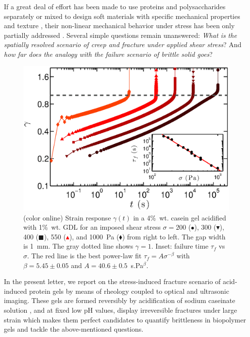 \documentclass[twocolumn,superscriptaddress,showpacs,preprintnumbers,amsmath,amssymb,prl]{revtex4}
\begin{document}
  If a great deal of effort has been made to use proteins and polysaccharides separately or mixed to design soft materials with specific mechanical properties and texture \cite{Dickinson:2006,Gibaud:2012}, their non-linear mechanical behavior under stress has been only partially addressed \cite{vanVliet:1995}. Several simple questions remain unanswered: {\it What is the spatially resolved scenario of creep and fracture under applied shear stress}? And {\it how far does the analogy with the failure scenario of brittle solid goes}? 
\begin{figure}
\centering
\includegraphics[width=0.9\columnwidth]{Fig1.eps}
\caption{(color online) Strain response $\gamma(t)$ in a 4\%~wt. casein gel acidified with 1\%~wt. GDL for an imposed shear stress $\sigma=200$ (\textcolor{red!25!black}{$\bullet$}), 300 (\textcolor{red!50!black}{$\blacktriangledown$}), 400 (\textcolor{red!75!black}{$\blacksquare$}), 550 (\textcolor{red}{$\blacktriangle$}), and 1000~Pa (\textcolor{orange!50!red}{$\blacklozenge$}) from right to left. The gap width is 1~mm. The gray dotted line shows $\gamma=1$. Inset: failure time $\tau_f$ vs $\sigma$. The red line is the best power-law fit $\tau_f=A\sigma^{-\beta}$ with $\beta=5.45\pm 0.05$ and $A=40.6\pm 0.5$~s.Pa$^\beta$.
\label{fig1}}
\end{figure} 
In the present letter, we report on the stress-induced fracture scenario of acid-induced protein gels by means of rheology coupled to optical and ultrasonic imaging. These gels are formed reversibly by acidification of sodium caseinate solution \cite{Lucey:1998}, and at fixed low pH values, display irreversible fractures under large strain \cite{vanVliet:1995} which makes them perfect candidates to quantify brittleness in biopolymer gels and tackle the above-mentioned questions. 
\end{document}
